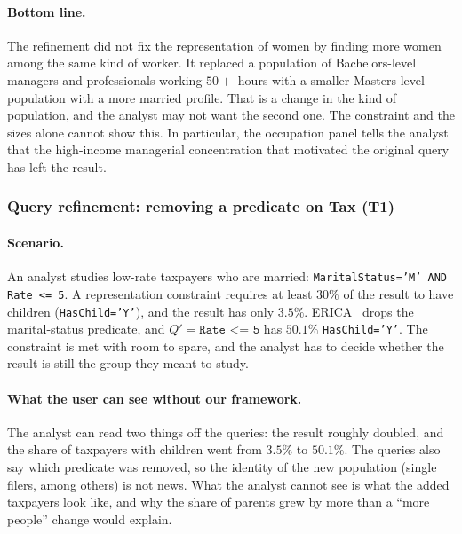 \paragraph{Bottom line.}
The refinement did not fix the representation of women by finding more women among the same kind of worker. It replaced a population of Bachelors-level managers and professionals working $50{+}$ hours with a smaller Masters-level population with a more married profile. That is a change in the kind of population, and the analyst may not want the second one. The constraint and the sizes alone cannot show this. In particular, the occupation panel tells the analyst that the high-income managerial concentration that motivated the original query has left the result.

\subsubsection{Query refinement: removing a predicate on Tax (T1)}
\label{subsec:case-tax}

\paragraph{Scenario.}
An analyst studies low-rate taxpayers who are married: \texttt{MaritalStatus='M' AND Rate <= 5}.
A representation constraint requires at least $30\%$ of the result to have children (\texttt{HasChild='Y'}), and the result has only $3.5\%$.
ERICA~\cite{LMSJ23,ERICA} drops the marital-status predicate, and $Q'=\texttt{Rate <= 5}$ has $50.1\%$ \texttt{HasChild='Y'}.
The constraint is met with room to spare, and the analyst has to decide whether the result is still the group they meant to study.

\paragraph{What the user can see without our framework.}
The analyst can read two things off the queries: the result roughly doubled, and the share of taxpayers with children went from $3.5\%$ to $50.1\%$. The queries also say which predicate was removed, so the identity of the new population (single filers, among others) is not news. What the analyst cannot see is what the added taxpayers look like, and why the share of parents grew by more than a ``more people'' change would explain.

